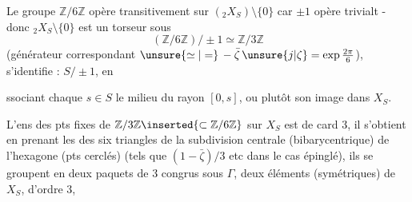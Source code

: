 
Le groupe $\mathbb Z/6\mathbb Z$ opère transitivement sur $({}_2X_S)\setminus\{0\}$ car $\pm1$ opère trivialt - donc ${}_2X_S\setminus\{0\}$ est un torseur sous
\[
(\mathbb Z/6\mathbb Z)/\pm1\simeq\mathbb Z/3\mathbb Z
\]
 (générateur correspondant $\unsure{\simeq|=}\,-\bar\zeta\,\unsure{j|\zeta}=\exp\frac{2\pi}{6}$),
  s'identifie : $S/\pm1$, en
ssociant  chaque $s\in S$ le milieu du rayon $[0,s]$, ou plutôt son image dans\inserted{)} $X_S$.

L'ens des pts fixes de $\mathbb Z/3\mathbb Z\inserted{\subset\mathbb Z/6\mathbb Z}$ sur $X_S$ est de card 3, il s'obtient en prenant les  des six triangles de la subdivision centrale (bibarycentrique) de l'hexagone (pts cerclés) (tels que $(1-\bar\zeta)/3$ etc dans le cas épinglé), ils se groupent en deux paquets de 3  congrus sous $\Gamma$,  deux éléments (symétriques) de $X_S$, d'ordre 3,

